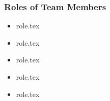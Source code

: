 \subsubsection*{Roles of Team Members} 

\begin{itemize}
    \item {role.tex}
    \item {role.tex}
    \item {role.tex}
    \item {role.tex}
    \item {role.tex}
\end{itemize}




